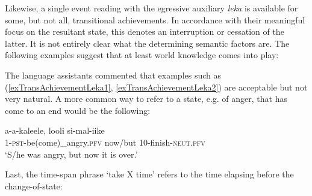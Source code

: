 Likewise, a single event reading with the egressive auxiliary \textit{leka} is available for some, but not all, transitional achievements. In accordance with their meaningful focus on the resultant state, this denotes an interruption or cessation of the latter. It is not entirely clear what the determining semantic factors are. The following examples suggest that at least world knowledge comes into play:

\begin{exe}
\ex\begin{xlist}
\end{xlist}
\end{exe}

The language assistants commented that examples such as (\ref{exTransAchievementLeka1}, \ref{exTransAchievementLeka2}) are acceptable but not very natural. A more common way to refer to a state, e.g. of anger, that has come to an end would be the following:

\begin{exe}
\ex 
\begin{xlist}
\gll a-a-kaleele, looli si-mal-iike\\
1-\textsc{pst}-be(come)\_angry.\textsc{pfv} now/but 10-finish-\textsc{neut.pfv}\\
\glt \lq S/he was angry, but now it is over.'
\end{xlist}
\end{exe}

Last, the time-span phrase \lq take X time' refers to the time elapsing before the change-of-state:

